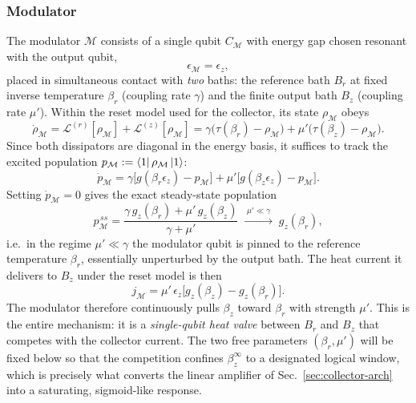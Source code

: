 \documentclass[11pt,a4paper]{article}
\theoremstyle{definition}
\theoremstyle{remark}
\begin{document}
\subsubsection{Modulator}\label{sec:modulator}
The modulator $\mathcal{M}$ consists of a single qubit $C_\mathcal{M}$ with
energy gap chosen resonant with the output qubit,
\[
\epsilon_\mathcal{M} = \epsilon_z ,
\]
placed in simultaneous contact with \emph{two} baths: the reference bath
$B_r$ at fixed inverse temperature $\beta_r$ (coupling rate $\gamma$) and
the finite output bath $B_z$ (coupling rate $\mu'$). Within the reset
model used for the collector, its state $\rho_\mathcal{M}$ obeys
\begin{equation}
\dot\rho_\mathcal{M}
= \mathcal{L}^{(r)}[\rho_\mathcal{M}] + \mathcal{L}^{(z)}[\rho_\mathcal{M}]
= \gamma\big(\tau(\beta_r)-\rho_\mathcal{M}\big)
+ \mu'\big(\tau(\beta_z)-\rho_\mathcal{M}\big).
\label{eq:mod_ME}
\end{equation}
Since both dissipators are diagonal in the energy basis, it suffices to
track the excited population $p_\mathcal{M} := \bra{1}\rho_\mathcal{M}\ket{1}$:
\begin{equation}
\dot p_\mathcal{M}
= \gamma\big[g(\beta_r\epsilon_z)-p_\mathcal{M}\big]
+ \mu'\big[g(\beta_z\epsilon_z)-p_\mathcal{M}\big].
\end{equation}
Setting $\dot p_\mathcal{M}=0$ gives the exact steady-state population
\begin{equation}
p_\mathcal{M}^{\,ss}
= \frac{\gamma\, g_z(\beta_r) + \mu'\, g_z(\beta_z)}{\gamma+\mu'}
\;\xrightarrow{\;\mu'\ll\gamma\;}\; g_z(\beta_r),
\label{eq:mod_ss}
\end{equation}
i.e.\ in the regime $\mu'\ll\gamma$ the modulator qubit is pinned to the
reference temperature $\beta_r$, essentially unperturbed by the output
bath. The heat current it delivers to $B_z$ under the reset model is then
\begin{equation}
j_\mathcal{M} = \mu'\,\epsilon_z\big[g_z(\beta_z)-g_z(\beta_r)\big].
\label{eq:jM}
\end{equation}
The modulator therefore continuously pulls $\beta_z$ toward $\beta_r$
with strength $\mu'$. This is the entire mechanism: it is a
\emph{single-qubit heat valve} between $B_r$ and $B_z$ that competes
with the collector current. The two free parameters $(\beta_r,\mu')$
will be fixed below so that the competition confines $\beta_z^\infty$ to
a designated logical window, which is precisely what converts the linear
amplifier of Sec.~\ref{sec:collector-arch} into a saturating,
sigmoid-like response.
 
\end{document}
